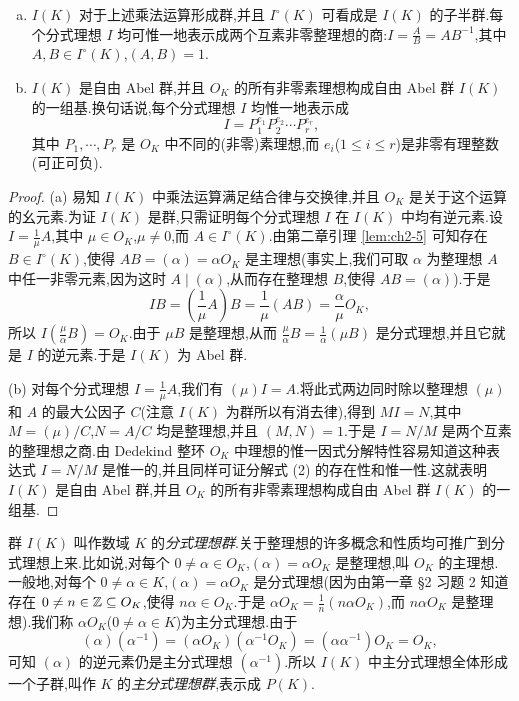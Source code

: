 \begin{theorem}\label{thm:3.2}
\begin{enumerate}[(a)]
  \item $I(K)$ 对于上述乘法运算形成群,并且 $I^{\circ}(K)$ 可看成是 $I(K)$ 的子半群.每个分式理想 $I$ 均可惟一地表示成两个互素非零整理想的商:$I=\frac{A}{B}=AB^{-1}$,其中 $A,B\in I^{\circ}(K)$,$(A,B)=1$.
  \item $I(K)$ 是自由 Abel 群,并且 $O_K$ 的所有非零素理想构成自由 Abel 群 $I(K)$ 的一组基.换句话说,每个分式理想 $I$ 均惟一地表示成
  \begin{equation}    I=P_1^{e_1}P_2^{e_2}\cdots P_r^{e_r},\tag{2}
  \end{equation}
  其中 $P_1,\cdots,P_r$ 是 $O_K$ 中不同的(非零)素理想,而 $e_i$($1\leqslant i\leqslant r$)是非零有理整数(可正可负).
\end{enumerate}
\end{theorem}

\begin{proof}
(a) 易知 $I(K)$ 中乘法运算满足结合律与交换律,并且 $O_K$ 是关于这个运算的幺元素.为证 $I(K)$ 是群,只需证明每个分式理想 $I$ 在 $I(K)$ 中均有逆元素.设 $I=\frac{1}{\mu}A$,其中 $\mu\in O_K$,$\mu\neq 0$,而 $A\in I^{\circ}(K)$.由第二章引理 \ref{lem:ch2-5} 可知存在 $B\in I^{\circ}(K)$,使得 $AB=(\alpha)=\alpha O_K$ 是主理想(事实上,我们可取 $\alpha$ 为整理想 $A$ 中任一非零元素,因为这时 $A\mid(\alpha)$,从而存在整理想 $B$,使得 $AB=(\alpha)$).于是
\[
  IB=\left(\frac{1}{\mu}A\right)B=\frac{1}{\mu}(AB)=\frac{\alpha}{\mu}O_K,
\]
所以 $I\left(\frac{\mu}{\alpha}B\right)=O_K$.由于 $\mu B$ 是整理想,从而 $\frac{\mu}{\alpha}B=\frac{1}{\alpha}(\mu B)$ 是分式理想,并且它就是 $I$ 的逆元素.于是 $I(K)$ 为 Abel 群.

(b) 对每个分式理想 $I=\frac{1}{\mu}A$,我们有 $(\mu)I=A$.将此式两边同时除以整理想 $(\mu)$ 和 $A$ 的最大公因子 $C$(注意 $I(K)$ 为群所以有消去律),得到 $MI=N$,其中 $M=(\mu)/C$,$N=A/C$ 均是整理想,并且 $(M,N)=1$.于是 $I=N/M$ 是两个互素的整理想之商.由 Dedekind 整环 $O_K$ 中理想的惟一因式分解特性容易知道这种表达式 $I=N/M$ 是惟一的,并且同样可证分解式 (2) 的存在性和惟一性.这就表明 $I(K)$ 是自由 Abel 群,并且 $O_K$ 的所有非零素理想构成自由 Abel 群 $I(K)$ 的一组基.
\end{proof}

\begin{sloppypar}
群 $I(K)$ 叫作数域 $K$ 的\emph{分式理想群}.关于整理想的许多概念和性质均可推广到分式理想上来.比如说,对每个 $0\neq\alpha\in O_K$,$(\alpha)=\alpha O_K$ 是整理想,叫 $O_K$ 的主理想.一般地,对每个 $0\neq\alpha\in K$,$(\alpha)=\alpha O_K$ 是分式理想(因为由第一章 §2 习题 2 知道存在 $0\neq n\in\mathbb{Z}\subseteq O_K$,使得 $n\alpha\in O_K$.于是 $\alpha O_K=\frac{1}{n}(n\alpha O_K)$,而 $n\alpha O_K$ 是整理想).我们称 $\alpha O_K$($0\neq\alpha\in K$)为主分式理想.由于
\[
  (\alpha)(\alpha^{-1})=(\alpha O_K)(\alpha^{-1}O_K)=(\alpha\alpha^{-1})O_K=O_K,
\]
可知 $(\alpha)$ 的逆元素仍是主分式理想 $(\alpha^{-1})$.所以 $I(K)$ 中主分式理想全体形成一个子群,叫作 $K$ 的\emph{主分式理想群},表示成 $P(K)$.
\end{sloppypar}

